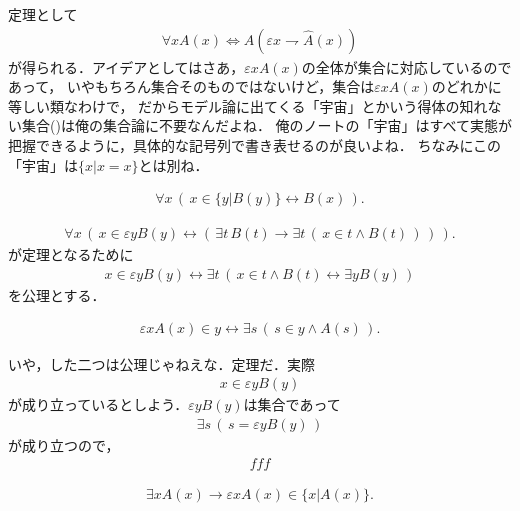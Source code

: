 	定理として
	\begin{align}
		\forall x A(x) \Longleftrightarrow A(\varepsilon x \rightharpoondown \hat{A}(x))
	\end{align}
	が得られる．アイデアとしてはさあ，$\varepsilon x A(x)$の全体が集合に対応しているのであって，
	いやもちろん集合そのものではないけど，集合は$\varepsilon x A(x)$のどれかに等しい類なわけで，
	だからモデル論に出てくる「宇宙」とかいう得体の知れない集合()は俺の集合論に不要なんだよね．
	俺のノートの「宇宙」はすべて実態が把握できるように，具体的な記号列で書き表せるのが良いよね．
	ちなみにこの「宇宙」は$\{x|x=x\}$とは別ね．
	
	\begin{screen}
		\begin{axm}
			\begin{align}
				\forall x\, \left(\, x \in \{y|B(y)\} \leftrightarrow B(x)\, \right).
			\end{align}
			
			\begin{align}
				\forall x\, \left(\, x \in \varepsilon y B(y) \leftrightarrow
				\left(\, \exists t\, B(t) \rightarrow 
				\exists t\, \left(\, x \in t \wedge B(t)\, \right)\, \right)\, \right).
			\end{align}
			が定理となるために
			\begin{align}
				x \in \varepsilon y B(y) \leftrightarrow
				\exists t\, \left(\, x \in t \wedge B(t) \leftrightarrow \exists y B(y)\, \right)
			\end{align}
			を公理とする．
			
			\begin{align}
				\varepsilon x A(x) \in y \leftrightarrow
				\exists s\, \left(\, s \in y \wedge A(s)\, \right).
			\end{align}
		\end{axm}
	\end{screen}
	
	いや，した二つは公理じゃねえな．定理だ．実際
	\begin{align}
		x \in \varepsilon y B(y)
	\end{align}
	が成り立っているとしよう．$\varepsilon y B(y)$は集合であって
	\begin{align}
		\exists s\, \left(\, s = \varepsilon y B(y)\, \right)
	\end{align}
	が成り立つので，
	\begin{align}
		fff
	\end{align}
	
	\begin{screen}
		\begin{thm}
			\begin{align}
				\exists x A(x) \rightarrow \varepsilon x A(x) \in \{x|A(x)\}.
			\end{align}
		\end{thm}
	\end{screen}
	
